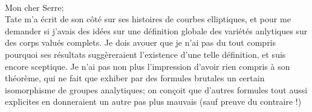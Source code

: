 
\\

Mon cher Serre;\\

Tate m'a écrit de son côté  sur ses histoires de courbes elliptiques, et pour me demander si j'avais des idées sur une définition globale des variétés anlytiques sur des corps valués complets. Je dois avouer que je n'ai pas du tout compris pourquoi ses résultats suggèreraient l'existence d'une telle définition, et suis encore sceptique. Je n'ai pas non plus l'impression d'avoir rien compris à son théorème, qui  ne fait que exhiber par des formules brutales un certain isomorphisme de groupes analytiques;  on conçoit que d'autres formules tout aussi explicites en donneraient un autre pas plus mauvais (sauf preuve du contraire !)

